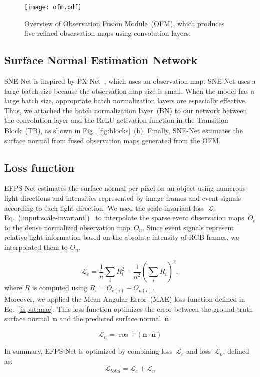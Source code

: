 \begin{figure}[t]
    \centering
    \texttt{[image: ofm.pdf]}
    \caption{Overview of Observation Fusion Module~(OFM), which produces five refined observation maps using convolution layers.}
    \label{fig:ofm}
\end{figure}

\subsection{Surface Normal Estimation Network}
SNE-Net is inspired by PX-Net~\citep{logothetis2021px}, which uses an observation map. SNE-Net uses a large batch size because the observation map size is small. When the model has a large batch size, appropriate batch normalization layers are especially effective. Thus, we attached the batch normalization layer~(BN) to our network between the convolution layer and the ReLU activation function in the Transition Block~(TB), as shown in Fig.~\ref{fig:blocks}~(b). 
Finally, SNE-Net estimates the surface normal from fused observation maps generated from the OFM.

\subsection{Loss function}
EFPS-Net estimates the surface normal per pixel on an object using numerous light directions and intensities represented by image frames and event signals according to each light direction. We used the scale-invariant loss~$\mathcal{L}_{e}$ Eq.~(\ref{input:scale-invariant})~\citep{eigen2014depth} to interpolate the sparse event observation maps~$O_{e}$ to the dense normalized observation map~$O_{n}$. Since event signals represent relative light information based on the absolute intensity of RGB frames, we interpolated them to $O_{n}$.

\begin{equation}
\mathcal{L}_{e} = \frac{1}{n}\sum_{i}R^{2}_{i}-\frac{1}{n^{2}}(\sum_{i}R_{i})^{2},
\label{input:scale-invariant}
\end{equation}
where $R$ is computed using $R_{i} = O_{\hat{e}(i)} - O_{n(i)}$.\\

Moreover, we applied the Mean Angular Error~(MAE) loss function defined in Eq.~\ref{input:mae}. This loss function optimizes the error between the ground truth surface normal~$\textbf{n}$ and the predicted surface normal~$\hat{\textbf{n}}$.

\begin{equation}
\mathcal{L}_{n} = \cos^{-1}(\textbf{n}\cdot \hat{\textbf{n}})
\label{input:mae}
\end{equation}

In summary, EFPS-Net is optimized by combining loss~$\mathcal{L}_{e}$ and loss~$\mathcal{L}_{n}$, defined as:
\begin{equation}
\mathcal{L}_{total} = \mathcal{L}_{e} + \mathcal{L}_{n}
\label{input:total}
\end{equation}